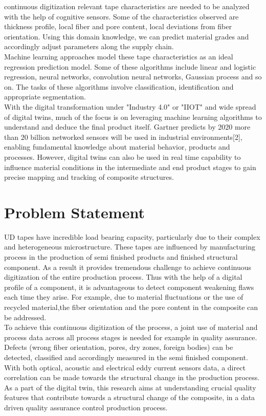 \documentclass[rnd]{mas_proposal}
\begin{document}
continuous digitization relevant tape characteristics are needed to be analyzed with the help of cognitive sensors. Some of the characteristics observed are thickness profile, local fiber and pore content, local deviations from fiber orientation. Using this domain knowledge, we can predict material grades and accordingly adjust parameters along the supply chain.\\
 \indent   Machine learning approaches model these tape characteristics as an ideal regression prediction model. Some of these algorithms include linear and logistic regression, neural networks, convolution neural networks, Gaussian process and so on. The tasks of these algorithms involve classification, identification and appropriate segmentation.\\
\indent With the digital transformation under "Industry 4.0" or "IIOT" and wide spread of digital twins, much of the focus is on leveraging machine learning algorithms to understand and deduce the final product itself. Gartner predicts by 2020 more than 20 billion networked sensors will be used in industrial environments[2], enabling fundamental knowledge about material behavior, products and processes. However, digital twins can also be used in real time capability to influence material conditions in the intermediate and end product stages to gain precise mapping and tracking of composite structures.  \\


\section{Problem Statement}
  \indent  UD tapes have incredible load bearing capacity, particularly due to their complex
and heterogeneous microstructure. These tapes are influenced by manufacturing
process in the production of semi finished products and finished structural
component. As a result it provides tremendous challenge to achieve continuous
digitization of the entire production process. Thus with the help of a digital profile of a component, it is advantageous to detect component weakening flaws each time they arise. For example, due to material fluctuations or the use of recycled material,the fiber orientation and the pore content in the composite can be addressed. \\
  \indent  To achieve this continuous digitization of the process, a joint use of material and
process data across all process stages is needed for example in quality assurance.
Defects (wrong fiber orientation, pores, dry zones, foreign bodies) can be detected,
classified and accordingly measured in the semi finished component. With both optical, acoustic and electrical eddy current sensors data, a direct correlation can be made towards the structural change in the production process. As a part of the digital twin, this research aims at understanding crucial quality features that contribute towards a structural change of the composite, in a data driven quality assurance control production process.\\
\end{document}
